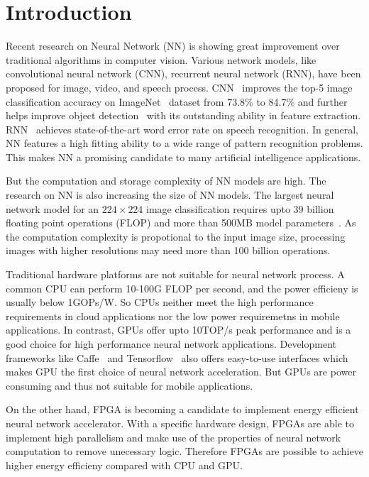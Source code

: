\section{Introduction}\label{sec:introduction}

Recent research on Neural Network (NN) is showing great improvement over traditional algorithms in computer vision. Various network models, like convolutional neural network (CNN), recurrent neural network (RNN), have been proposed for image, video, and speech process. CNN~\cite{krizhevsky2012imagenet} improves the top-5 image classification accuracy on ImageNet~\cite{ILSVRC15} dataset from 73.8\% to 84.7\% and further helps improve object detection~\cite{girshick2014rich} with its outstanding ability in feature extraction. RNN~\cite{hannun2014deep} achieves state-of-the-art word error rate on speech recognition. In general, NN features a high fitting ability to a wide range of pattern recognition problems. This makes NN a promising candidate to many artificial intelligence applications.

But the computation and storage complexity of NN models are high. The research on NN is also increasing the size of NN models. The largest neural network model for an $224\times224$ image classification requires upto 39 billion floating point operations (FLOP) and more than 500MB model parameters~\cite{simonyan2014very}. As the computation complexity is propotional to the input image size, processing images with higher resolutions may need more than 100 billion operations.

Traditional hardware platforms are not suitable for neural network process. A common CPU can perform 10-100G FLOP per second, and the power efficieny is usually below 1GOPs/W. So CPUs neither meet the high performance requirements in cloud applications nor the low power requiremetns in mobile applications. In contrast, GPUs offer upto 10TOP/s peak performance and is a good choice for high performance neural network applications. Development frameworks like Caffe~\cite{jia2014caffe} and Tensorflow~\cite{abadi2016tensorflow} also offers easy-to-use interfaces which makes GPU the first choice of neural network acceleration. But GPUs are power consuming and thus not suitable for mobile applications.

On the other hand, FPGA is becoming a candidate to implement energy efficient neural network accelerator. With a specific hardware design, FPGAs are able to implement high parallelism and make use of the properties of neural network computation to remove unecessary logic. Therefore FPGAs are possible to achieve higher energy efficieny compared with CPU and GPU. 

